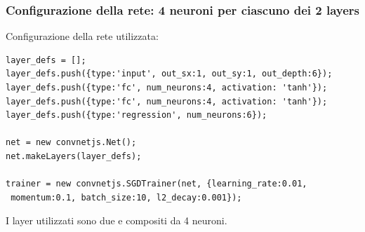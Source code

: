 \subsubsection{Configurazione della rete:  4 neuroni per ciascuno dei 2 layers}
\label{Configurazione della rete: 4 neuroni per 2 ciascuno dei layers}

Configurazione della rete utilizzata:\\
\begin{verbatim}layer_defs = [];
layer_defs.push({type:'input', out_sx:1, out_sy:1, out_depth:6});
layer_defs.push({type:'fc', num_neurons:4, activation: 'tanh'});
layer_defs.push({type:'fc', num_neurons:4, activation: 'tanh'});
layer_defs.push({type:'regression', num_neurons:6});

net = new convnetjs.Net();
net.makeLayers(layer_defs);

trainer = new convnetjs.SGDTrainer(net, {learning_rate:0.01,
 momentum:0.1, batch_size:10, l2_decay:0.001});
\end{verbatim}
\noindent
I layer utilizzati sono due e compositi da 4 neuroni.

